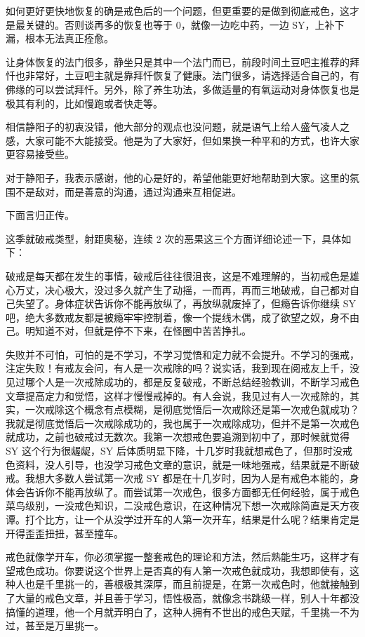 \documentclass[fontset=founder]{ctexart}
\begin{document}
如何更好更快地恢复的确是戒色后的一个问题，但更重要的是做到彻底戒色，这才是最关键的。否则谈再多的恢复也等于 0，就像一边吃中药，一边 SY，上补下漏，根本无法真正痊愈。

让身体恢复的法门很多，静坐只是其中一个法门而已，前段时间土豆吧主推荐的拜忏也非常好，土豆吧主就是靠拜忏恢复了健康。法门很多，请选择适合自己的，有佛缘的可以尝试拜忏。另外，除了养生功法，多做适量的有氧运动对身体恢复也是极其有利的，比如慢跑或者快走等。

相信静阳子的初衷没错，他大部分的观点也没问题，就是语气上给人盛气凌人之感，大家可能不大能接受。他是为了大家好，但如果换一种平和的方式，也许大家更容易接受些。

对于静阳子，我表示感谢，他的心是好的，希望他能更好地帮助到大家。这里的氛围不是敌对，而是善意的沟通，通过沟通来互相促进。

下面言归正传。

这季就破戒类型，射距奥秘，连续 2 次的恶果这三个方面详细论述一下，具体如下：

破戒是每天都在发生的事情，破戒后往往很沮丧，这是不难理解的，当初戒色是雄心万丈，决心极大，没过多久就产生了动摇，一而再，再而三地破戒，自己都对自己失望了。身体症状告诉你不能再放纵了，再放纵就废掉了，但瘾告诉你继续 SY 吧，绝大多数戒友都是被瘾牢牢控制着，像一个提线木偶，成了欲望之奴，身不由己。明知道不对，但就是停不下来，在怪圈中苦苦挣扎。

失败并不可怕，可怕的是不学习，不学习觉悟和定力就不会提升。不学习的强戒，注定失败！有戒友会问，有人是一次戒除的吗？说实话，我到现在阅戒友上千，没见过哪个人是一次戒除成功的，都是反复破戒，不断总结经验教训，不断学习戒色文章提高定力和觉悟，这样才慢慢戒掉的。有人会说，我见过有人一次戒除的，其实，一次戒除这个概念有点模糊，是彻底觉悟后一次戒除还是第一次戒色就成功？我就是彻底觉悟后一次戒除成功的，我也属于一次戒除成功，但并不是第一次戒色就成功，之前也破戒过无数次。我第一次想戒色要追溯到初中了，那时候就觉得 SY 这个行为很龌龊，SY 后体质明显下降，十几岁时我就想戒色了，但那时没戒色资料，没人引导，也没学习戒色文章的意识，就是一味地强戒，结果就是不断破戒。我想大多数人尝试第一次戒 SY 都是在十几岁时，因为人是有戒色本能的，身体会告诉你不能再放纵了。而尝试第一次戒色，很多方面都无任何经验，属于戒色菜鸟级别，一没戒色知识，二没戒色意识，在这种情况下想一次戒除简直是天方夜谭。打个比方，让一个从没学过开车的人第一次开车，结果是什么呢？结果肯定是开得歪歪扭扭，甚至撞车。

戒色就像学开车，你必须掌握一整套戒色的理论和方法，然后熟能生巧，这样才有望戒色成功。你要说这个世界上是否真的有人第一次戒色就成功，我想即使有，这种人也是千里挑一的，善根极其深厚，而且前提是，在第一次戒色时，他就接触到了大量的戒色文章，并且善于学习，悟性极高，就像念书跳级一样，别人十年都没搞懂的道理，他一个月就弄明白了，这种人拥有不世出的戒色天赋，千里挑一不为过，甚至是万里挑一。
\end{document}
